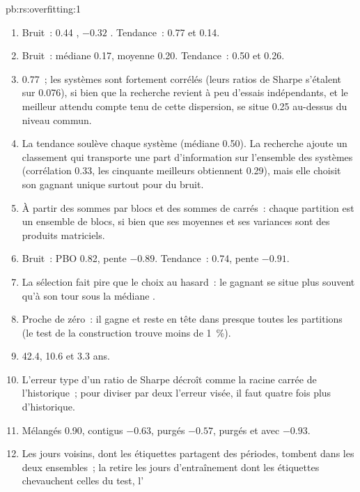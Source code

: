 \begin{solution}{pb:rs:overfitting:1}
\begin{enumerate}
\item Bruit~: 0.44 , $-0.32$ . Tendance~: 0.77 et 0.14.
\item Bruit~: médiane  0.17, moyenne  0.20. Tendance~: 0.50 et 0.26.
\item 0.77~; les systèmes sont fortement corrélés (leurs ratios de Sharpe s'étalent sur 0.076), si bien que la recherche revient à peu d'essais indépendants, et le meilleur attendu
compte tenu de cette dispersion, se situe 0.25 au-dessus du niveau commun.
\item La tendance soulève chaque système (médiane 0.50). La recherche ajoute un classement qui transporte une part d'information sur l'ensemble des systèmes (corrélation 0.33,
les cinquante meilleurs obtiennent 0.29), mais elle choisit son gagnant unique surtout pour du bruit.
\item À partir des sommes par blocs et des sommes de carrés~: chaque partition est un ensemble de blocs, si bien que ses moyennes et ses variances sont des produits matriciels.
\item Bruit~: PBO 0.82, pente $-0.89$. Tendance~: 0.74, pente $-0.91$.
\item La sélection fait pire que le choix au hasard~: le gagnant  se situe plus souvent qu'à son tour sous la médiane .
\item Proche de zéro~: il gagne  et reste en tête  dans presque toutes les partitions (le test de la construction trouve moins de 1~\%).
\item 42.4, 10.6 et 3.3 ans.
\item L'erreur type d'un ratio de Sharpe décroît comme la racine carrée de l'historique~; pour diviser par deux l'erreur visée, il faut
quatre fois plus d'historique.
\item Mélangés 0.90, contigus $-0.63$, purgés $-0.57$, purgés et avec  $-0.93$.
\item Les jours voisins, dont les étiquettes partagent des périodes, tombent dans les deux ensembles~; la  retire les jours d'entraînement dont les étiquettes chevauchent celles du test, l'

\end{enumerate}
\end{solution}
